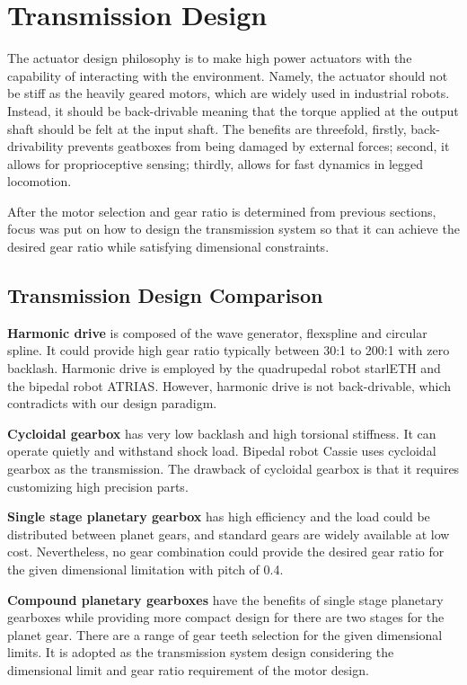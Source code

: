 \section{\textbf{Transmission Design}}
\label{sec:transmissionDesign}

The actuator design philosophy is to make high power actuators with the capability of interacting with the environment. Namely, the actuator should not be stiff as the heavily geared motors, which are widely used in industrial robots. Instead, it should be back-drivable meaning that the torque applied at the output shaft should be felt at the input shaft. The benefits are threefold, firstly, back-drivability prevents geatboxes from being damaged by external forces; second, it allows for proprioceptive sensing\cite{Seok2012}; thirdly, allows for fast dynamics in legged locomotion.

After the motor selection and gear ratio is determined from previous sections, focus was put on how to design the transmission system so that it can achieve the desired gear ratio while satisfying dimensional constraints.

\subsection{\textbf{Transmission Design Comparison}}
\label{sec:transmissionComparison}

\textbf{Harmonic drive} is composed of the wave generator, flexspline and circular spline. It could provide high gear ratio typically between 30:1 to 200:1 with zero backlash. Harmonic drive is employed by the quadrupedal robot starlETH\cite{Hutter2013} and the bipedal robot ATRIAS\cite{Hubicki2016}. However, harmonic drive is not back-drivable, which contradicts with our design paradigm.

\textbf{Cycloidal gearbox} has very low backlash and high torsional stiffness. It can operate quietly and withstand shock load. Bipedal robot Cassie uses cycloidal gearbox as the transmission. The drawback of cycloidal gearbox is that it requires customizing high precision parts.

\textbf{Single stage planetary gearbox} has high efficiency and the load could be distributed between planet gears, and standard gears are widely available at low cost. Nevertheless, no gear combination could provide the desired gear ratio for the given dimensional limitation with pitch of 0.4.

\textbf{Compound planetary gearboxes} have the benefits of single stage planetary gearboxes while providing more compact design for there are two stages for the planet gear. There are a range of gear teeth selection for the given dimensional limits. It is adopted as the transmission system design considering the dimensional limit and gear ratio requirement of the motor design.

